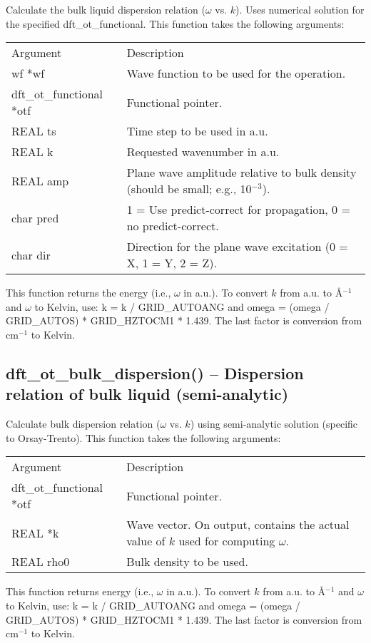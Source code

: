 \documentclass[12pt,letterpaper]{report}
\begin{document}
Calculate the bulk liquid dispersion relation ($\omega$ vs. $k$). Uses numerical solution for the specified dft\_ot\_functional. This function takes the following arguments:
\begin{longtable}{p{} p{}}
Argument & Description\\
\cline{1-2}
wf *wf & Wave function to be used for the operation.\\
dft\_ot\_functional *otf & Functional pointer.\\
REAL ts & Time step to be used in a.u.\\
REAL k & Requested wavenumber in a.u.\\
REAL amp & Plane wave amplitude relative to bulk density (should be small; e.g., 10$^{-3}$).\\
char pred & 1 = Use predict-correct for propagation, 0 = no predict-correct.\\
char dir & Direction for the plane wave excitation (0 = X, 1 = Y, 2 = Z).\\
\end{longtable}
\noindent
This function returns the energy (i.e., $\omega$ in a.u.). To convert $k$ from a.u. to \AA{}$^{-1}$ and $\omega$ to Kelvin, use: k = k / GRID\_AUTOANG and omega = (omega / GRID\_AUTOS) * GRID\_HZTOCM1 * 1.439. The last factor is conversion from cm$^{-1}$ to Kelvin.

\subsection{dft\_ot\_bulk\_dispersion() -- Dispersion relation of bulk liquid (semi-analytic)}

Calculate bulk dispersion relation ($\omega$ vs. $k$) using semi-analytic solution (specific to Orsay-Trento). This function takes the following arguments:
\begin{longtable}{p{} p{}}
Argument & Description\\
\cline{1-2}
dft\_ot\_functional *otf & Functional pointer.\\
REAL *k & Wave vector. On output, contains the actual value of $k$ used for computing $\omega$.\\
REAL rho0 & Bulk density to be used.\\
\end{longtable}
\noindent
This function returns energy (i.e., $\omega$ in a.u.). To convert $k$ from a.u. to \AA{}$^{-1}$ and $\omega$ to Kelvin, use: k = k / GRID\_AUTOANG and omega = (omega / GRID\_AUTOS) * GRID\_HZTOCM1 * 1.439. The last factor is conversion from cm$^{-1}$ to Kelvin.
\end{document}
